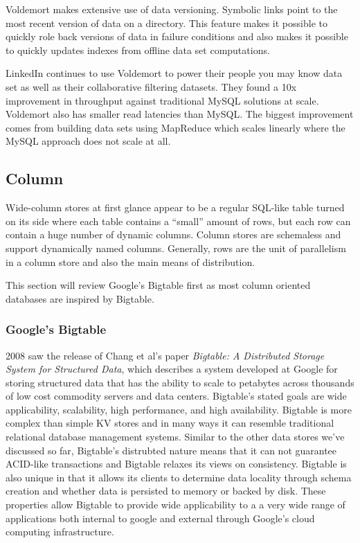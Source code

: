 \documentclass[]{article}
\begin{document}
Voldemort makes extensive use of data versioning. Symbolic links point to the most recent version of data on a directory. This feature makes it possible to quickly role back versions of data in failure conditions and also makes it possible to quickly updates indexes from offline data set computations.

LinkedIn continues to use Voldemort to power their people you may know data set as well as their collaborative filtering datasets. They found a 10x improvement in throughput against traditional MySQL solutions at scale. Voldemort also has smaller read latencies than MySQL. The biggest improvement comes from building data sets using MapReduce which scales linearly where the MySQL approach does not scale at all.



\subsection{Column}
Wide-column stores at first glance appear to be a regular SQL-like table turned on its side where each table contains a ``small'' amount of rows, but each row can contain a huge number of dynamic columns. Column stores are schemaless and support dynamically named columns. Generally, rows are the unit of parallelism in a column store and also the main means of distribution. 

This section will review Google's Bigtable first as most column oriented databases are inspired by Bigtable.

\subsubsection{Google's Bigtable}
2008 saw the release of Chang et al's paper \textit{Bigtable: A Distributed Storage System for Structured Data}, which describes a system developed at Google for storing structured data that has the ability to scale to petabytes across thousands of low cost commodity servers and data centers. Bigtable's stated goals are wide applicability, scalability, high performance, and high availability. Bigtable is more complex than simple KV stores and in many ways it can resemble traditional relational database management systems. Similar to the other data stores we've discussed so far, Bigtable's distrubted nature means that it can not guarantee ACID-like transactions and Bigtable relaxes its views on consistency. Bigtable is also unique in that it allows its clients to determine data locality through schema creation and whether data is persisted to memory or backed by disk. These properties allow Bigtable to provide wide applicability to a a very wide range of applications both internal to google and external through Google's cloud computing infrastructure.
\end{document}
